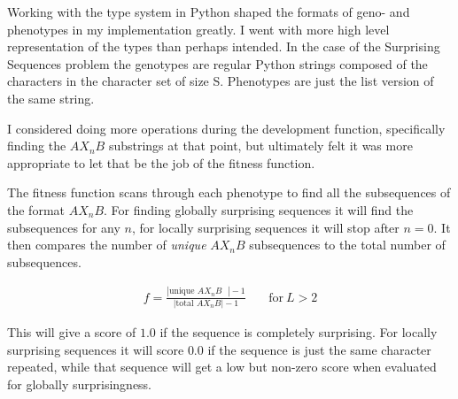 Working with the type system in Python shaped the formats of geno- and phenotypes in my implementation greatly.
I went with more high level representation of the types than perhaps intended.
In the case of the Surprising Sequences problem the genotypes are regular Python strings composed of the characters in the character set of size S.
Phenotypes are just the list version of the same string.

I considered doing more operations during the development function,
specifically finding the $AX_nB$ substrings at that point,
but ultimately felt it was more appropriate to let that be the job of the fitness function.

The fitness function scans through each phenotype to find all the subsequences of the format $AX_nB$.
For finding globally surprising sequences it will find the subsequences for any $n$, for locally surprising sequences it will stop after $n=0$.
It then compares the number of \textit{unique} $AX_nB$ subsequences to the total number of subsequences.

\begin{align*}
    f
    =
    \frac{
        \left|\text{unique $AX_nB$ }\right| - 1
    }{
        \left|\text{total $AX_nB$}\right| - 1
    }
    &~&
    \text{for} ~ L > 2
\end{align*}

This will give a score of $1.0$ if the sequence is completely surprising.
For locally surprising sequences it will score $0.0$ if the sequence is just the same character repeated,
while that sequence will get a low but non-zero score when evaluated for globally surprisingness.

